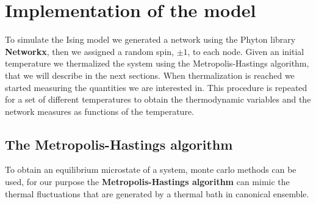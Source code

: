 \section{Implementation of the model}
To simulate the Ising model we generated a network using the Phyton library \textbf{Networkx}, then we assigned a random spin, $\pm1$, to each node. Given an initial temperature we thermalized the system using the Metropolis-Hastings algorithm, that we will describe in the next sections. When thermalization is reached we started measuring the quantities we are interested in. This procedure is repeated for a set of different temperatures to obtain the thermodynamic variables and the network measures as functions of the temperature.
\subsection{The Metropolis-Hastings algorithm}
To obtain an equilibrium microstate of a system, monte carlo methods can be used, for our purpose the \textbf{Metropolis-Hastings algorithm} can mimic the thermal fluctuations that are generated by a thermal bath in canonical ensemble.

